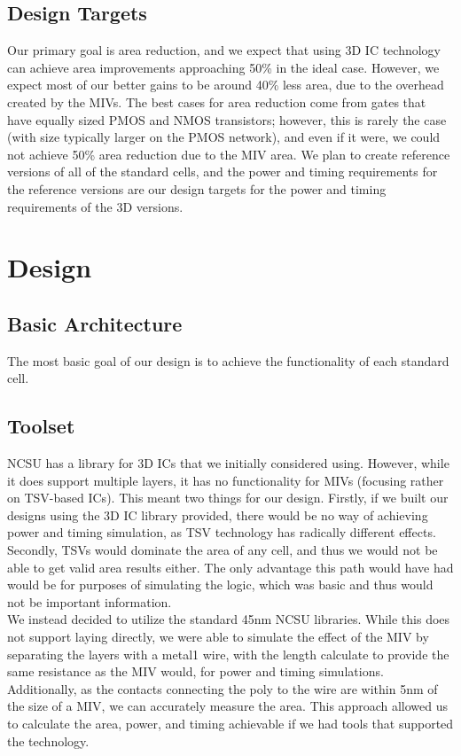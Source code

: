 \documentclass{article}
\begin{document}
\subsection{Design Targets} Our primary goal is area reduction, and we expect that using 3D IC technology can achieve area improvements approaching 50\% in the ideal case. However, we expect most of our better gains to be around 40\% less area, due to the overhead created by the MIVs. The best cases for area reduction come from gates that have equally sized PMOS and NMOS transistors; however, this is rarely the case (with size typically larger on the PMOS network), and even if it were, we could not achieve 50\% area reduction due to the MIV area. We plan to create reference versions of all of the standard cells, and the power and timing requirements for the reference versions are our design targets for the power and timing requirements of the 3D versions. 

\section{Design}
\subsection{Basic Architecture} The most basic goal of our design is to achieve the functionality of each standard cell. 
\subsection{Toolset} NCSU has a library for 3D ICs that we initially considered using. However, while it does support multiple layers, it has no functionality for MIVs (focusing rather on TSV-based ICs). This meant two things for our design. Firstly, if we built our designs using the 3D IC library provided, there would be no way of achieving power and timing simulation, as TSV technology has radically different effects. Secondly, TSVs would dominate the area of any cell, and thus we would not be able to get valid area results either. The only advantage this path would have had would be for purposes of simulating the logic, which was basic and thus would not be important information. \\ 
We instead decided to utilize the standard 45nm NCSU libraries. While this does not support laying directly, we were able to simulate the effect of the MIV by separating the layers with a metal1 wire, with the length calculate to provide the same resistance as the MIV would, for power and timing simulations. Additionally, as the contacts connecting the poly to the wire are within 5nm of the size of a MIV, we can accurately measure the area. This approach allowed us to calculate the area, power, and timing achievable if we had tools that supported the technology. 
\end{document}
